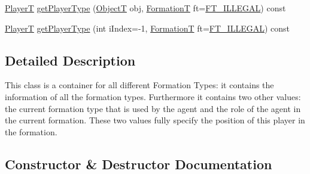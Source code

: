 \begin{DoxyCompactItemize}
\item 
\hyperlink{SoccerTypes_8h_a88daf580b042467ccd4098107cffc718}{PlayerT} \hyperlink{classFormations_aeb476d961e67951300683265e66ff022}{get\+Player\+Type} (\hyperlink{SoccerTypes_8h_ad4b701fa66e7d26c054ed15b7820c77c}{ObjectT} obj, \hyperlink{SoccerTypes_8h_ac803bd9e3400705765031836994a385d}{FormationT} ft=\hyperlink{SoccerTypes_8h_ac803bd9e3400705765031836994a385dadf3294904b0ea24dce056d2b043429cb}{F\+T\+\_\+\+I\+L\+L\+E\+G\+AL}) const 
\item 
\hyperlink{SoccerTypes_8h_a88daf580b042467ccd4098107cffc718}{PlayerT} \hyperlink{classFormations_ae5167443b6f3d0c26f08de7e53d20f48}{get\+Player\+Type} (int i\+Index=-\/1, \hyperlink{SoccerTypes_8h_ac803bd9e3400705765031836994a385d}{FormationT} ft=\hyperlink{SoccerTypes_8h_ac803bd9e3400705765031836994a385dadf3294904b0ea24dce056d2b043429cb}{F\+T\+\_\+\+I\+L\+L\+E\+G\+AL}) const 
\end{DoxyCompactItemize}


\subsection{Detailed Description}
This class is a container for all different Formation Types\+: it contains the information of all the formation types. Furthermore it contains two other values\+: the current formation type that is used by the agent and the role of the agent in the current formation. These two values fully specify the position of this player in the formation. 

\subsection{Constructor \& Destructor Documentation}
